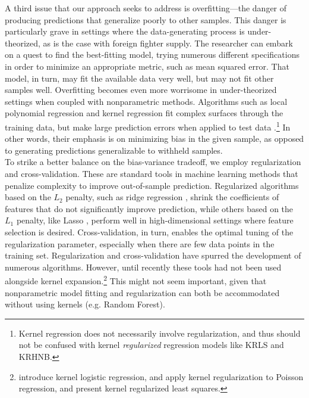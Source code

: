 \documentclass[12pt]{article}
\begin{document}
A third issue that our approach seeks to address is overfitting---the danger of producing predictions that generalize poorly to other samples. This danger is particularly grave in settings where the data-generating process is under-theorized, as is the case with foreign fighter supply. The researcher can embark on a quest to find the best-fitting model, trying numerous different specifications in order to minimize an appropriate metric, such as mean squared error. That model, in turn, may fit the available data very well, but may not fit other samples well. Overfitting becomes even more worrisome in under-theorized settings when coupled with nonparametric methods. Algorithms such as local polynomial regression and kernel regression fit complex surfaces through the training data, but make large prediction errors when applied to test data \citep{Mroz1999}.\footnote{Kernel regression does not necessarily involve regularization, and thus should not be confused with kernel \textit{regularized} regression models like KRLS and KRHNB.} In other words, their emphasis is on minimizing bias in the given sample, as opposed to generating predictions generalizable to withheld samples.		\\

To strike a better balance on the bias-variance tradeoff, we employ regularization and cross-validation. These are standard tools in machine learning methods that penalize complexity to improve out-of-sample prediction. Regularized algorithms based on the $L_2$ penalty, such as ridge regression \citep{Hoerl1970}, shrink the coefficients of features that do not significantly improve prediction, while others based on the $L_1$ penalty, like Lasso \citep{Tibshirani1996}, perform well in high-dimensional settings where feature selection is desired. Cross-validation, in turn, enables the optimal tuning of the regularization parameter, especially when there are few data points in the training set. Regularization and cross-validation have spurred the development of numerous algorithms. However, until recently these tools had not been used alongside kernel expansion.\footnote{\cite{Zhu2005} introduce kernel logistic regression, \cite{Shim2011} and \cite{Shim2012} apply kernel regularization to Poisson regression, and \cite{Hainmueller2013} present kernel regularized least squares.} This might not seem important, given that nonparametric model fitting and regularization can both be accommodated without using kernels (e.g. Random Forest). 	\\
\end{document}
